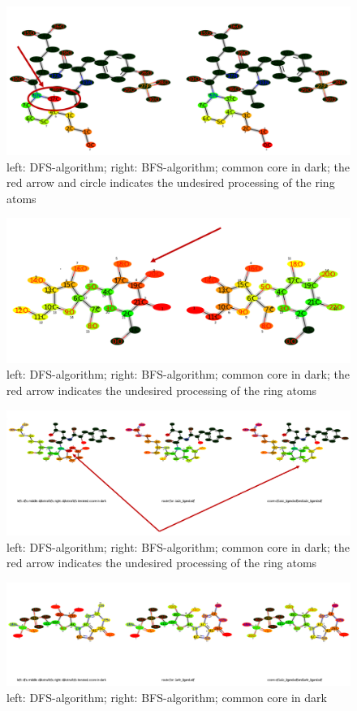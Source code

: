 \begin{figure}
\includegraphics[scale=0.4]{simple_ring_exampledfs3}\caption{left: DFS-algorithm; right: BFS-algorithm; common core in dark; the
red arrow and circle indicates the undesired processing of the ring
atoms}

\end{figure}
\begin{figure}

\includegraphics[scale=0.4]{simple_ring_exampledfs4}\caption{left: DFS-algorithm; right: BFS-algorithm; common core in dark; the
red arrow indicates the undesired processing of the ring atoms}

\end{figure}

\begin{figure}

\includegraphics[scale=0.45]{2ring_example}\caption{left: DFS-algorithm; right: BFS-algorithm; common core in dark; the
red arrow indicates the undesired processing of the ring atoms}

\end{figure}

\begin{figure}

\includegraphics[scale=0.45]{2ring_example2}\caption{left: DFS-algorithm; right: BFS-algorithm; common core in dark}

\end{figure}
